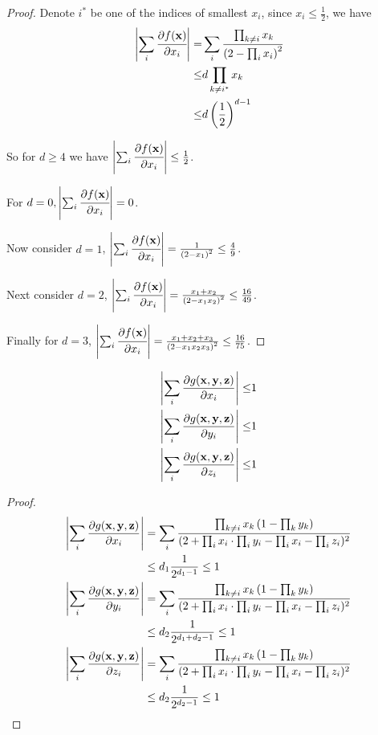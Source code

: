 	\begin{proof}
		Denote $i^*$ be one of the indices of smallest $x_i$, since $x_i \leq \frac{1}{2}$, we have
	\begin{align*}
		\left\vert\sum_i \cfrac{\partial f({\bf x})}{\partial x_i}\right\vert  =& \sum_i \cfrac{ \prod_{k \neq i} x_k  }{\left( 2 - \prod_i x_i \right)^2} \\
		\leq & d \prod_{k \neq i^*} x_k \\
		\leq & d \left( \frac{1}{2} \right)^{d-1}
	\end{align*}

	So for $d \geq 4$ we have $\left\vert\sum_i \cfrac{\partial f({\bf x})}{\partial x_i}\right\vert \leq \frac{1}{2}$.

	For $d=0, \left\vert\sum_i \cfrac{\partial f({\bf x})}{\partial x_i}\right\vert = 0$.

	Now consider $d=1$, $\left\vert\sum_i \cfrac{\partial f({\bf x})}{\partial x_i}\right\vert = \frac{1}{\left( 2 - x_1 \right)^2} \leq \frac{4}{9} $.

	Next consider $d=2$,  $\left\vert\sum_i \cfrac{\partial f({\bf x})}{\partial x_i}\right\vert = \frac{x_1 + x_2}{\left( 2 - x_1x_2 \right)^2} \leq \frac{16}{49} $.

	Finally for $d=3$,  $\left\vert\sum_i \cfrac{\partial f({\bf x})}{\partial x_i}\right\vert = \frac{x_1 + x_2 + x_3}{\left( 2 - x_1x_2x_3 \right)^2} \leq \frac{16}{75} $.
	\end{proof}


	\begin{Lem}
		\begin{align*}
			\left\vert \sum_i \frac{\partial g({\bf x,y,z})}{\partial x_i} \right\vert \leq & 1 \\
			\left\vert \sum_i \frac{\partial g({\bf x,y,z})}{\partial y_i} \right\vert \leq & 1 \\
			\left\vert \sum_i \frac{\partial g({\bf x,y,z})}{\partial z_i} \right\vert \leq & 1
		\end{align*}
	\end{Lem}

	\begin{proof}
		\begin{align*}
		\left\vert \sum_i \frac{\partial g({\bf x,y,z})}{\partial x_i} \right\vert &= \sum_i \frac{\prod_{k\neq i} x_k \left( 1 - \prod_k y_k \right)}{(2+\prod_i x_i \cdot \prod_i y_i - \prod_i x_i - \prod_i z_i)^2} \\
		&\leq d_1 \frac{1}{2^{d_1 - 1}}  \leq 1 \\
		\left\vert \sum_i \frac{\partial g({\bf x,y,z})}{\partial y_i} \right\vert &= \sum_i \frac{\prod_{k\neq i} x_k \left( 1 - \prod_k y_k \right)}{(2+\prod_i x_i \cdot \prod_i y_i - \prod_i x_i - \prod_i z_i)^2} \\
		&\leq d_2 \frac{1}{2^{d_1 + d_2 - 1}} \leq 1 \\
		\left\vert \sum_i \frac{\partial g({\bf x,y,z})}{\partial z_i} \right\vert &= \sum_i \frac{\prod_{k\neq i} x_k \left( 1 - \prod_k y_k \right)}{(2+\prod_i x_i \cdot \prod_i y_i - \prod_i x_i - \prod_i z_i)^2} \\
		&\leq d_2 \frac{1}{2^{d_2 - 1}} \leq 1 \\
		\end{align*}
	\end{proof}

